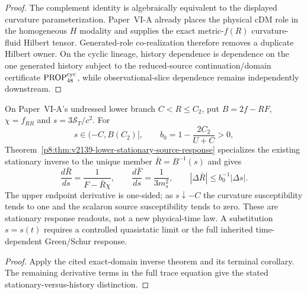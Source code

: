 \documentclass[12pt,a4paper]{article}
\begin{document}
\begin{proof}
The complement identity is algebraically equivalent to the displayed
curvature parameterization.  Paper~VI-A already places the physical cDM role
in the homogeneous $H$ modality and supplies the exact metric-$f(R)$
curvature-fluid Hilbert tensor.  Generated-role co-realization therefore removes a duplicate Hilbert owner.
On the cyclic lineage, history dependence is dependence on the one generated
history subject to the reduced-source continuation/domain certificate
\(\mathrm{PROP}^{\rm cyc}_{48}\), while observational-slice dependence remains
independently downstream.

\end{proof}

\begin{corollary}
\label{p9:cor:v1103-stationary-source-readout}
On Paper~VI-A's undressed lower branch $C<R\le C_2$, put
$B=2f-RF$, $\chi=f_{RR}$ and $s=3\mathcal S_T/c^2$.  For
\[
 s\in(-C,B(C_2)],\qquad b_0=1-\frac{2C_2}{U+C}>0,
\]
Theorem~\ref{p8:thm:v2139-lower-stationary-source-response} specializes the
existing stationary inverse to the unique member $\bar R=B^{-1}(s)$ and gives
\[
 \boxed{\frac{d\bar R}{ds}=\frac1{F-\bar R\chi},\qquad
 \frac{d\bar F}{ds}=\frac1{3m_s^2},\qquad
 |\Delta\bar R|\le b_0^{-1}|\Delta s|.}
\]
The upper endpoint derivative is one-sided; as $s\downarrow-C$ the curvature
susceptibility tends to one and the scalaron source susceptibility tends to
zero.  These are stationary response readouts, not a new physical-time law.
A substitution $s=s(t)$ requires a controlled quasistatic limit or the full
inherited time-dependent Green/Schur response.
\end{corollary}
\begin{proof}
Apply the cited exact-domain inverse theorem and its terminal corollary.  The
remaining derivative terms in the full trace equation give the stated
stationary-versus-history distinction.
\end{proof}
\end{document}
